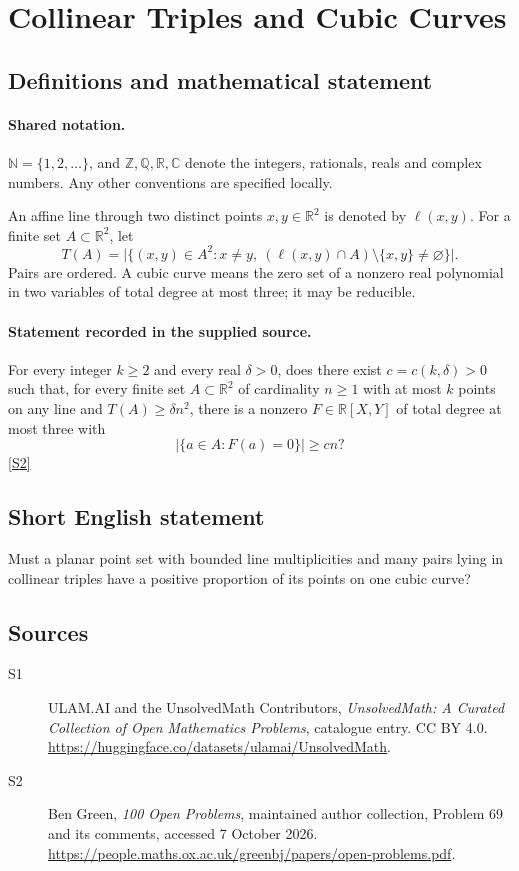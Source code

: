 \documentclass[11pt]{article}
\newcommand{\sref}[2]{\hyperlink{source:#1:#2}{[S#2]}}
\begin{document}
\section{Collinear Triples and Cubic Curves}\label{statement}

\subsection{Definitions and mathematical statement}

\paragraph{Shared notation.}$\mathbb N=\{1,2,\ldots\}$, and $\mathbb Z,\mathbb Q,\mathbb R,\mathbb C$ denote the integers, rationals, reals and complex numbers. Any other conventions are specified locally.


An affine line through two distinct points $x,y\in\mathbb R^2$ is denoted by $\ell(x,y)$. For a finite set $A\subset\mathbb R^2$, let
\[
 T(A)=\bigl|\{(x,y)\in A^2:x\ne y,\ (\ell(x,y)\cap A)\setminus\{x,y\}\ne\varnothing\}\bigr|.
\]
Pairs are ordered. A cubic curve means the zero set of a nonzero real polynomial in two variables of total degree at most three; it may be reducible.
\paragraph{Statement recorded in the supplied source.}
For every integer $k\geq2$ and every real $\delta>0$, does there exist $c=c(k,\delta)>0$ such that, for every finite set $A\subset\mathbb R^2$ of cardinality $n\geq1$ with at most $k$ points on any line and $T(A)\geq\delta n^2$, there is a nonzero $F\in\mathbb R[X,Y]$ of total degree at most three with
\[
 |\{a\in A:F(a)=0\}|\geq cn?
\] \sref{statement}{2}
\subsection{Short English statement}
Must a planar point set with bounded line multiplicities and many pairs lying in collinear triples have a positive proportion of its points on one cubic curve?
\subsection{Sources}
\begin{description}
\item[\hypertarget{source:statement:1}{S1}] ULAM.AI and the UnsolvedMath Contributors, \emph{UnsolvedMath: A Curated Collection of Open Mathematics Problems}, catalogue entry. CC BY 4.0. \url{https://huggingface.co/datasets/ulamai/UnsolvedMath}.
\item[\hypertarget{source:statement:2}{S2}] Ben Green, \emph{100 Open Problems}, maintained author collection, Problem 69 and its comments, accessed 7 October 2026. \url{https://people.maths.ox.ac.uk/greenbj/papers/open-problems.pdf}.
\end{description}
\label{end:statement}
\end{document}
